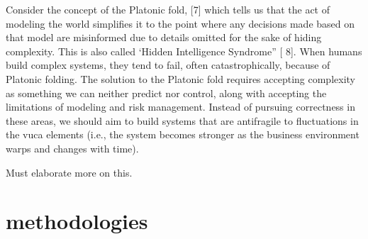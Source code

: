Consider the concept of the Platonic fold, [7] which tells us that the act of modeling the world
simplifies it to the point where any decisions made based on that model are misinformed due to details omitted for
the sake of hiding complexity. This is also called ‘Hidden Intelligence Syndrome” [ 8]. When humans build complex systems, they tend to fail, often catastrophically, because of Platonic folding. The
solution to the Platonic fold requires accepting complexity as something we can neither predict nor control, along
with accepting the limitations of modeling and risk management. Instead of pursuing correctness in these areas, we
should aim to build systems that are \gls{antifragile} to fluctuations in the \acrshort{vuca} elements (i.e., the system becomes stronger as the business environment warps and changes with time). \parencite[p. 885]{OReilly2019}

\begin{remark}
	Must elaborate more on this.
\end{remark}

\section{methodologies}



